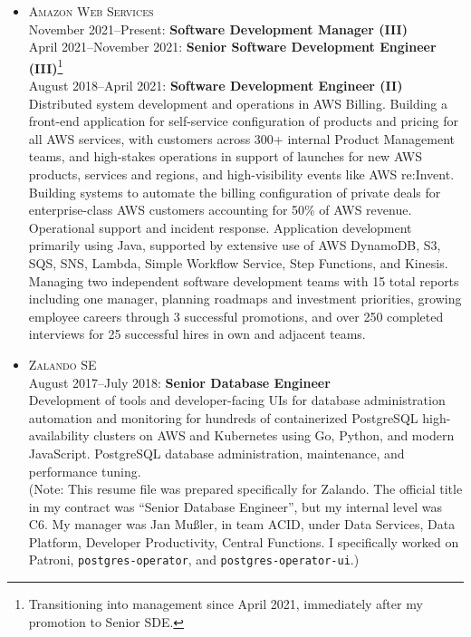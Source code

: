 \documentclass{res}
\begin{document}
\begin{resume}
\begin{itemize}[leftmargin=-0.3in]
    \item
      \textsc{Amazon Web Services}
      \\ November 2021--Present: \textbf{Software Development Manager (III)}
      \\ April 2021--November 2021: \textbf{Senior Software Development Engineer (III)}\footnote{Transitioning into management since April 2021, immediately after my promotion to Senior SDE.}
      \\ August 2018--April 2021: \textbf{Software Development Engineer (II)}
      \\ \small{Distributed system development and operations in AWS Billing.  Building a front-end application for self-service configuration of products and pricing for all AWS services, with customers across 300+ internal Product Management teams, and high-stakes operations in support of launches for new AWS products, services and regions, and high-visibility events like AWS re:Invent.  Building systems to automate the billing configuration of private deals for enterprise-class AWS customers accounting for 50\% of AWS revenue.  Operational support and incident response.  Application development primarily using Java, supported by extensive use of AWS DynamoDB, S3, SQS, SNS, Lambda, Simple Workflow Service, Step Functions, and Kinesis.}
      \\ \small{Managing two independent software development teams with 15 total reports including one manager, planning roadmaps and investment priorities, growing employee careers through 3 successful promotions, and over 250 completed interviews for 25 successful hires in own and adjacent teams.}

    \item
      \textsc{Zalando SE}
      \\ August 2017--July 2018: \textbf{Senior Database Engineer}
      \\ \small{Development of tools and developer-facing UIs for database administration automation and monitoring for hundreds of containerized PostgreSQL high-availability clusters on AWS and Kubernetes using Go, Python, and modern JavaScript. PostgreSQL database administration, maintenance, and performance tuning.}
      \\ \small{(Note: This resume file was prepared specifically for Zalando.  The official title in my contract was ``Senior Database Engineer'', but my internal level was C6.  My manager was Jan Mußler, in team ACID, under Data Services, Data Platform, Developer Productivity, Central Functions.  I specifically worked on Patroni, \texttt{postgres-operator}, and \texttt{postgres-operator-ui}.)}


\end{itemize}
\end{resume}
\end{document}

